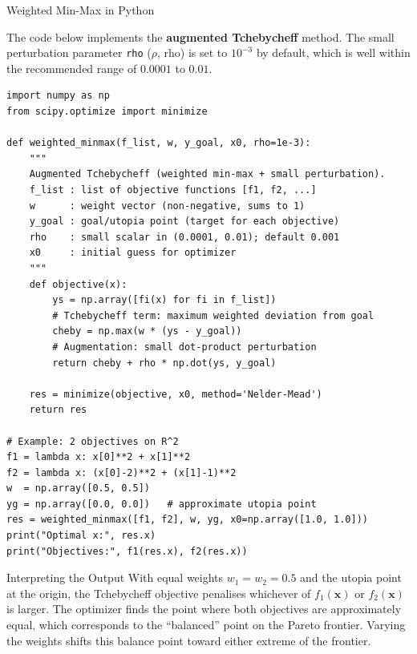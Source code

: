 \documentclass[aspectratio=169,10pt]{beamer}
\newcommand{\bx}{\mathbf{x}}
\begin{document}
\begin{frame}[fragile]{Weighted Min-Max in Python}

The code below implements the \textbf{augmented Tchebycheff} method.  The
small perturbation parameter \texttt{rho} ($\rho$, rho) is set to $10^{-3}$
by default, which is well within the recommended range of $0.0001$ to $0.01$.

\begin{lstlisting}
import numpy as np
from scipy.optimize import minimize

def weighted_minmax(f_list, w, y_goal, x0, rho=1e-3):
    """
    Augmented Tchebycheff (weighted min-max + small perturbation).
    f_list : list of objective functions [f1, f2, ...]
    w      : weight vector (non-negative, sums to 1)
    y_goal : goal/utopia point (target for each objective)
    rho    : small scalar in (0.0001, 0.01); default 0.001
    x0     : initial guess for optimizer
    """
    def objective(x):
        ys = np.array([fi(x) for fi in f_list])
        # Tchebycheff term: maximum weighted deviation from goal
        cheby = np.max(w * (ys - y_goal))
        # Augmentation: small dot-product perturbation
        return cheby + rho * np.dot(ys, y_goal)

    res = minimize(objective, x0, method='Nelder-Mead')
    return res

# Example: 2 objectives on R^2
f1 = lambda x: x[0]**2 + x[1]**2
f2 = lambda x: (x[0]-2)**2 + (x[1]-1)**2
w  = np.array([0.5, 0.5])
yg = np.array([0.0, 0.0])   # approximate utopia point
res = weighted_minmax([f1, f2], w, yg, x0=np.array([1.0, 1.0]))
print("Optimal x:", res.x)
print("Objectives:", f1(res.x), f2(res.x))
\end{lstlisting}

\begin{exampleblock}{Interpreting the Output}
  With equal weights $w_1 = w_2 = 0.5$ and the utopia point at the origin,
  the Tchebycheff objective penalises whichever of $f_1(\bx)$ or
  $f_2(\bx)$ is larger.  The optimizer finds the point where both objectives
  are approximately equal, which corresponds to the ``balanced'' point on the
  Pareto frontier.  Varying the weights shifts this balance point toward
  either extreme of the frontier.
\end{exampleblock}

\end{frame}
\end{document}
